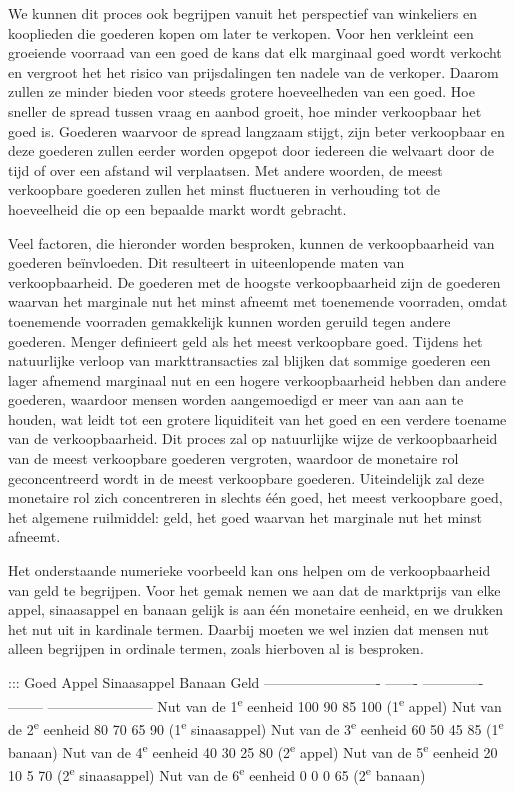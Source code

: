 \documentclass[
  a5paper,
  smalldemyvopaper,11pt,twoside,onecolumn,openright,extrafontsizes,
hidelinks]{memoir}
\begin{document}
We kunnen dit proces ook begrijpen vanuit het perspectief van winkeliers
en kooplieden die goederen kopen om later te verkopen. Voor hen
verkleint een groeiende voorraad van een goed de kans dat elk marginaal
goed wordt verkocht en vergroot het het risico van prijsdalingen ten
nadele van de verkoper. Daarom zullen ze minder bieden voor steeds
grotere hoeveelheden van een goed. Hoe sneller de spread tussen vraag en
aanbod groeit, hoe minder verkoopbaar het goed is. Goederen waarvoor de
spread langzaam stijgt, zijn beter verkoopbaar en deze goederen zullen
eerder worden opgepot door iedereen die welvaart door de tijd of over
een afstand wil verplaatsen. Met andere woorden, de meest verkoopbare
goederen zullen het minst fluctueren in verhouding tot de hoeveelheid
die op een bepaalde markt wordt gebracht.

Veel factoren, die hieronder worden besproken, kunnen de verkoopbaarheid
van goederen beïnvloeden. Dit resulteert in uiteenlopende maten van
verkoopbaarheid. De goederen met de hoogste verkoopbaarheid zijn de
goederen waarvan het marginale nut het minst afneemt met toenemende
voorraden, omdat toenemende voorraden gemakkelijk kunnen worden geruild
tegen andere goederen. Menger definieert geld als het meest verkoopbare
goed. Tijdens het natuurlijke verloop van markttransacties zal blijken
dat sommige goederen een lager afnemend marginaal nut en een hogere
verkoopbaarheid hebben dan andere goederen, waardoor mensen worden
aangemoedigd er meer van aan aan te houden, wat leidt tot een grotere
liquiditeit van het goed en een verdere toename van de verkoopbaarheid.
Dit proces zal op natuurlijke wijze de verkoopbaarheid van de meest
verkoopbare goederen vergroten, waardoor de monetaire rol geconcentreerd
wordt in de meest verkoopbare goederen. Uiteindelijk zal deze monetaire
rol zich concentreren in slechts één goed, het meest verkoopbare goed,
het algemene ruilmiddel: geld, het goed waarvan het marginale nut het
minst afneemt.

Het onderstaande numerieke voorbeeld kan ons helpen om de
verkoopbaarheid van geld te begrijpen. Voor het gemak nemen we aan dat
de marktprijs van elke appel, sinaasappel en banaan gelijk is aan één
monetaire eenheid, en we drukken het nut uit in kardinale termen.
Daarbij moeten we wel inzien dat mensen nut alleen begrijpen in ordinale
termen, zoals hierboven al is besproken.

::: Goed Appel Sinaasappel Banaan Geld ------------------------- -------
------------- -------- ----------------------- Nut van de
1\textsuperscript{e} eenheid 100 90 85 100 (1\textsuperscript{e} appel)
Nut van de 2\textsuperscript{e} eenheid 80 70 65 90
(1\textsuperscript{e} sinaasappel) Nut van de 3\textsuperscript{e}
eenheid 60 50 45 85 (1\textsuperscript{e} banaan) Nut van de
4\textsuperscript{e} eenheid 40 30 25 80 (2\textsuperscript{e} appel)
Nut van de 5\textsuperscript{e} eenheid 20 10 5 70 (2\textsuperscript{e}
sinaasappel) Nut van de 6\textsuperscript{e} eenheid 0 0 0 65
(2\textsuperscript{e} banaan)
\end{document}
